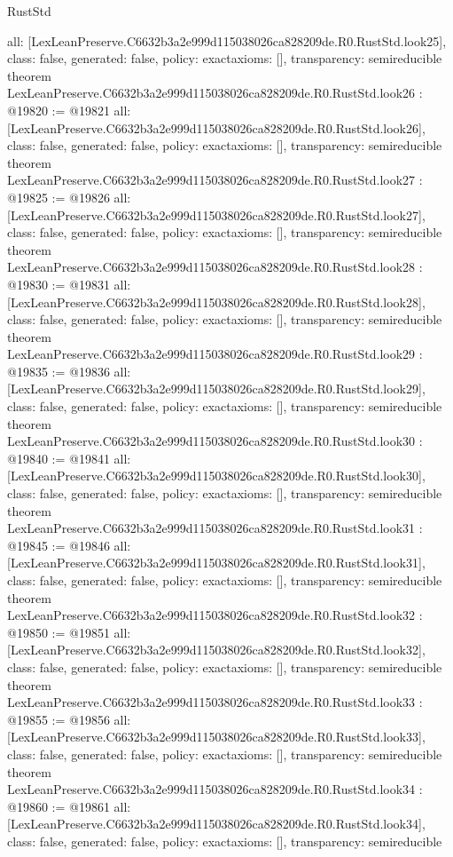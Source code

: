 \begin{lexlean}{RustStd}
\begin{coremodule}
{  all: [LexLeanPreserve.C6632b3a2e999d115038026ca828209de.R0.RustStd.look25],
  class: false,
  generated: false,
  policy: exact{axioms: []},
  transparency: semireducible
}
theorem LexLeanPreserve.C6632b3a2e999d115038026ca828209de.R0.RustStd.look26 : @19820 := @19821 {
  all: [LexLeanPreserve.C6632b3a2e999d115038026ca828209de.R0.RustStd.look26],
  class: false,
  generated: false,
  policy: exact{axioms: []},
  transparency: semireducible
}
theorem LexLeanPreserve.C6632b3a2e999d115038026ca828209de.R0.RustStd.look27 : @19825 := @19826 {
  all: [LexLeanPreserve.C6632b3a2e999d115038026ca828209de.R0.RustStd.look27],
  class: false,
  generated: false,
  policy: exact{axioms: []},
  transparency: semireducible
}
theorem LexLeanPreserve.C6632b3a2e999d115038026ca828209de.R0.RustStd.look28 : @19830 := @19831 {
  all: [LexLeanPreserve.C6632b3a2e999d115038026ca828209de.R0.RustStd.look28],
  class: false,
  generated: false,
  policy: exact{axioms: []},
  transparency: semireducible
}
theorem LexLeanPreserve.C6632b3a2e999d115038026ca828209de.R0.RustStd.look29 : @19835 := @19836 {
  all: [LexLeanPreserve.C6632b3a2e999d115038026ca828209de.R0.RustStd.look29],
  class: false,
  generated: false,
  policy: exact{axioms: []},
  transparency: semireducible
}
theorem LexLeanPreserve.C6632b3a2e999d115038026ca828209de.R0.RustStd.look30 : @19840 := @19841 {
  all: [LexLeanPreserve.C6632b3a2e999d115038026ca828209de.R0.RustStd.look30],
  class: false,
  generated: false,
  policy: exact{axioms: []},
  transparency: semireducible
}
theorem LexLeanPreserve.C6632b3a2e999d115038026ca828209de.R0.RustStd.look31 : @19845 := @19846 {
  all: [LexLeanPreserve.C6632b3a2e999d115038026ca828209de.R0.RustStd.look31],
  class: false,
  generated: false,
  policy: exact{axioms: []},
  transparency: semireducible
}
theorem LexLeanPreserve.C6632b3a2e999d115038026ca828209de.R0.RustStd.look32 : @19850 := @19851 {
  all: [LexLeanPreserve.C6632b3a2e999d115038026ca828209de.R0.RustStd.look32],
  class: false,
  generated: false,
  policy: exact{axioms: []},
  transparency: semireducible
}
theorem LexLeanPreserve.C6632b3a2e999d115038026ca828209de.R0.RustStd.look33 : @19855 := @19856 {
  all: [LexLeanPreserve.C6632b3a2e999d115038026ca828209de.R0.RustStd.look33],
  class: false,
  generated: false,
  policy: exact{axioms: []},
  transparency: semireducible
}
theorem LexLeanPreserve.C6632b3a2e999d115038026ca828209de.R0.RustStd.look34 : @19860 := @19861 {
  all: [LexLeanPreserve.C6632b3a2e999d115038026ca828209de.R0.RustStd.look34],
  class: false,
  generated: false,
  policy: exact{axioms: []},
  transparency: semireducible
}
\end{coremodule}
\end{lexlean}
